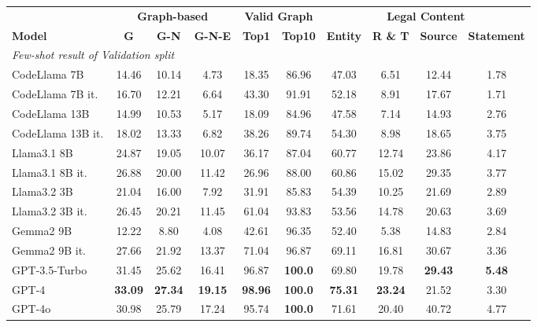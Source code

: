 \begin{table*}[t]
\centering
\footnotesize
\begin{tabular}{lccccccccc}
\toprule
    &\multicolumn{3}{c}{\textbf{Graph-based}}  & \multicolumn{2}{c}{\textbf{Valid Graph}} & \multicolumn{4}{c}{\textbf{Legal Content}} \\
    \cmidrule(lr){2-4} \cmidrule(lr){5-6} \cmidrule(lr){7-10}
\textbf{Model} &\textbf{G} & \textbf{G-N} & \textbf{G-N-E} & \textbf{Top1} & \textbf{Top10} & \textbf{Entity} & \textbf{R \& T} & \textbf{Source} & \textbf{Statement} \\
\midrule
\multicolumn{7}{l}{\textit{Few-shot result of Validation split}} \\
CodeLlama 7B & 14.46 & 10.14 & 4.73 & 18.35 & 86.96 & 47.03 & 6.51 & 12.44 & 1.78 \\
CodeLlama 7B it. & 16.70 & 12.21 & 6.64 & 43.30 & 91.91 & 52.18 & 8.91 & 17.67 & 1.71 \\
CodeLlama 13B & 14.99 & 10.53 & 5.17 & 18.09 & 84.96 & 47.58 & 7.14 & 14.93 & 2.76\\
CodeLlama 13B it. \hspace{-1em} & 18.02 & 13.33 & 6.82 & 38.26  & 89.74 &  54.30 & 8.98 & 18.65 & 3.75 \\
Llama3.1 8B & 24.87 & 19.05 & 10.07 & 36.17 & 87.04 & 60.77 & 12.74 & 23.86 & 4.17\\
Llama3.1 8B it. \hspace{-1em} & 26.88 & 20.00 & 11.42 & 26.96 & 88.00 & 60.86 & 15.02 & 29.35 & 3.77\\
Llama3.2 3B & 21.04 & 16.00 & 7.92 & 31.91 & 85.83 & 54.39 & 10.25 & 21.69 & 2.89\\
Llama3.2 3B it. \hspace{-1em} &  26.45 & 20.21 & 11.45 & 61.04 & 93.83 &  53.56 & 14.78 & 20.63 & 3.69 \\
Gemma2 9B  & 12.22 & 8.80 & 4.08 & 42.61 & 96.35 & 52.40 & 5.38 & 14.83 & 2.84\\
Gemma2 9B it. & 27.66 & 21.92 & 13.37 & 71.04 & 96.87 & 69.11 & 16.81 & 30.67 & 3.36\\
GPT-3.5-Turbo & 31.45 & 25.62 & 16.41 & 96.87 & \textbf{100.0} & 69.80 & 19.78 & \textbf{29.43} & \textbf{5.48}\\
GPT-4         & \textbf{33.09} & \textbf{27.34} & \textbf{19.15} & \textbf{98.96} & \textbf{100.0} & \textbf{75.31} & \textbf{23.24} & 21.52 & 3.30\\
GPT-4o        & 30.98 & 25.79 & 17.24 & 95.74 & \textbf{100.0} & 71.61 & 20.40 & 40.72 & 4.77\\

\end{tabular}
\end{table*}

